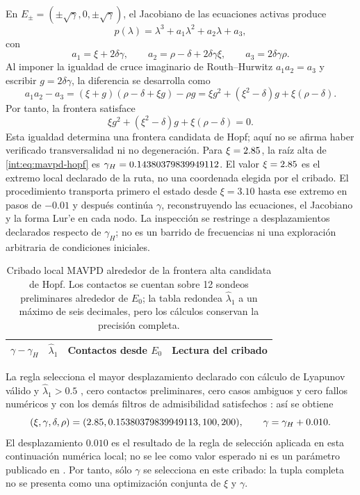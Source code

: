 En $E_\pm=(\pm\sqrt{\gamma},0,\pm\sqrt{\gamma})$, el Jacobiano de las
ecuaciones activas produce
\begin{equation}
 p(\lambda)=\lambda^3+a_1\lambda^2+a_2\lambda+a_3,
 \label{int:eq:mavpd-characteristic}
\end{equation}
con
\begin{equation}
 a_1=\xi+2\delta\gamma,\qquad
 a_2=\rho-\delta+2\delta\gamma\xi,\qquad
 a_3=2\delta\gamma\rho.
 \label{int:eq:mavpd-routh-coefficients}
\end{equation}
Al imponer la igualdad de cruce imaginario de Routh--Hurwitz
$a_1a_2=a_3$ y escribir \(g=2\delta\gamma\), la diferencia se desarrolla como
\[
 a_1a_2-a_3=(\xi+g)(\rho-\delta+\xi g)-\rho g
 =\xi g^2+(\xi^2-\delta)g+\xi(\rho-\delta).
\]
Por tanto, la frontera satisface
\begin{equation}
 \xi g^2+(\xi^2-\delta)g+\xi(\rho-\delta)=0.
 \label{int:eq:mavpd-hopf}
\end{equation}
Esta igualdad determina una frontera candidata de Hopf; aquí no se afirma
haber verificado transversalidad ni no degeneración. Para
$\xi=2.85$, la raíz alta de \eqref{int:eq:mavpd-hopf} es
$\gamma_H=0.14380379839949112$. El valor $\xi=2.85$ es el extremo local
declarado de la ruta, no una coordenada elegida por el cribado. El procedimiento
transporta primero el estado desde $\xi=3.10$ hasta ese extremo en pasos de
$-0.01$ y después continúa
$\gamma$, reconstruyendo las ecuaciones, el Jacobiano y la forma Lur'e en cada
nodo. La inspección se restringe a desplazamientos declarados respecto de
$\gamma_H$; no es un barrido de frecuencias ni una exploración arbitraria de
condiciones iniciales.

\ifHAFOBasinMaterial
\begin{table}[H]
\centering
\caption{Cribado local MAVPD alrededor de la frontera alta candidata de Hopf. Los
contactos se cuentan sobre 12 sondeos preliminares alrededor de $E_0$; la tabla
redondea $\widehat\lambda_1$ a un máximo de seis decimales, pero los cálculos
conservan la precisión completa.}
\label{int:tab:mavpd-chaos-screen}
\small
\begin{tabular}{@{}C{1.8cm}C{2.0cm}C{2.3cm}L{8.7cm}@{}}
\toprule
$\gamma-\gamma_H$ & $\widehat\lambda_1$ & Contactos desde $E_0$ & Lectura del cribado \\
\midrule

\end{tabular}
\end{table}
\fi

La regla selecciona el mayor desplazamiento declarado con cálculo de Lyapunov
válido y $\widehat\lambda_1>0.5$
\ifHAFOBasinMaterial
, cero contactos preliminares, cero casos ambiguos y cero fallos numéricos
\else
y con los demás filtros de admisibilidad satisfechos
\fi
: así se obtiene
\[
 (\xi,\gamma,\delta,\rho)=
 (2.85,0.15380379839949113,100,200),\qquad
 \gamma=\gamma_H+0.010.
\]
El desplazamiento $0.010$ es el resultado de la regla de selección aplicada en
esta continuación numérica local; no se lee como valor esperado ni es un
parámetro publicado en \cite{matouk2023}. Por tanto, sólo $\gamma$ se selecciona
en este cribado: la tupla completa no se presenta como una optimización conjunta
de $\xi$ y $\gamma$.

